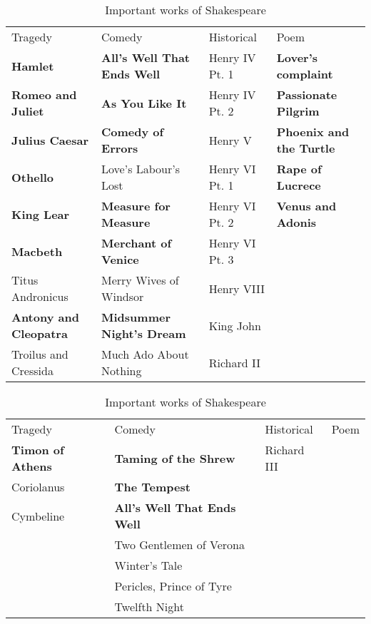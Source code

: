 \documentclass[
  12pt,
    progressbar=frametitle]{beamer}
\begin{document}
\begin{frame}[allowframebreaks]
\begin{table}[h!]
\scriptsize
\centering
\begin{tabular}{m{} m{} m{} m{}}
\cellcolor{violet!60}\color{white}Tragedy &
\cellcolor{violet!60}\color{white}Comedy &
\cellcolor{violet!60}\color{white}Historical &
\cellcolor{violet!60}\color{white}Poem \\
\textbf{Hamlet} & \textbf{All's Well That Ends Well} & Henry IV Pt. 1 & \textbf{Lover's complaint} \\
\textbf{Romeo and Juliet} & \textbf{As You Like It} & Henry IV Pt. 2 & \textbf{Passionate Pilgrim} \\
\textbf{Julius Caesar} & \textbf{Comedy of Errors} & Henry V & \textbf{Phoenix and the Turtle} \\
\textbf{Othello} & Love's Labour's Lost & Henry VI Pt. 1 & \textbf{Rape of Lucrece} \\
\textbf{King Lear} & \textbf{Measure for Measure} & Henry VI Pt. 2 & \textbf{Venus and Adonis} \\
\textbf{Macbeth} & \textbf{Merchant of Venice} & Henry VI Pt. 3 &  \\
Titus Andronicus & Merry Wives of Windsor & Henry VIII &  \\
\textbf{Antony and Cleopatra} & \textbf{Midsummer Night's Dream} & King John &  \\
Troilus and Cressida & Much Ado About Nothing & Richard II &  \\
\end{tabular}

\vspace{15mm}
\begin{tabular}{m{} m{} m{} m{}}
\cellcolor{violet!60}\color{white}Tragedy &
\cellcolor{violet!60}\color{white}Comedy &
\cellcolor{violet!60}\color{white}Historical &
\cellcolor{violet!60}\color{white}Poem \\

\textbf{Timon of Athens} & \textbf{Taming of the Shrew} & Richard III &  \\
Coriolanus & \textbf{The Tempest} &  &  \\
Cymbeline & \textbf{All's Well That Ends Well} &  &  \\
 & Two Gentlemen of Verona &  &  \\
 & Winter's Tale &  &  \\
 & Pericles, Prince of Tyre &  &  \\
 & Twelfth Night &  &  \\
\end{tabular}
\vspace{3mm}\caption{Important works of Shakespeare}
\label{table:shakes.txt}
\end{table}
\end{frame}
\end{document}
